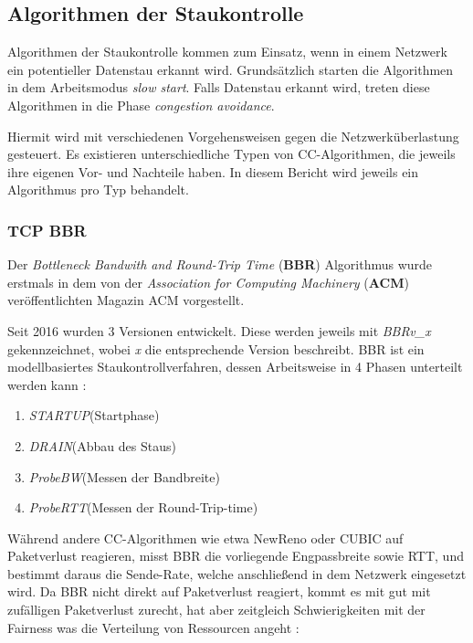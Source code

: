 \documentclass[paper=a4,fontsize=12pt,ngerman]{scrartcl}
\begin{document}
\subsection{Algorithmen der Staukontrolle }

Algorithmen der Staukontrolle kommen zum Einsatz, wenn in einem Netzwerk ein potentieller Datenstau erkannt wird.
Grundsätzlich starten die Algorithmen in dem Arbeitsmodus \textit{slow start}.
Falls Datenstau erkannt wird, treten diese Algorithmen in die Phase \textit{congestion avoidance}.


Hiermit wird mit verschiedenen Vorgehensweisen gegen die Netzwerküberlastung gesteuert. 
\newline
Es existieren unterschiedliche Typen von CC-Algorithmen, die jeweils ihre eigenen Vor- und Nachteile haben.
In diesem Bericht wird jeweils ein Algorithmus pro Typ behandelt.





\subsubsection{TCP BBR} 
Der \textit{Bottleneck Bandwith and Round-Trip Time} (\textbf{BBR}) Algorithmus wurde erstmals in dem von der
\textit{Association for Computing Machinery} (\textbf{ACM}) veröffentlichten Magazin ACM vorgestellt. \cite{cardwell2016bbr}

Seit 2016 wurden 3 Versionen entwickelt. Diese werden jeweils mit \textit{BBRv\_x} gekennzeichnet, 
wobei \textit{x} die entsprechende Version beschreibt. 
BBR ist ein modellbasiertes Staukontrollverfahren, dessen Arbeitsweise in 4 Phasen
unterteilt werden kann : \newline

\begin{enumerate}
    \item \textit{STARTUP}(Startphase)
    \item \textit{DRAIN}(Abbau des Staus)
    \item \textit{ProbeBW}(Messen der Bandbreite)
    \item \textit{ProbeRTT}(Messen der Round-Trip-time)
\end{enumerate}


Während andere CC-Algorithmen wie etwa NewReno oder CUBIC auf Paketverlust reagieren, misst BBR die vorliegende Engpassbreite sowie RTT,
und bestimmt daraus die Sende-Rate, welche anschließend in dem Netzwerk eingesetzt wird. 
Da BBR nicht direkt auf Paketverlust reagiert, kommt es mit gut mit zufälligen Paketverlust zurecht, hat aber zeitgleich
Schwierigkeiten mit der Fairness was die Verteilung von Ressourcen angeht : 
\end{document}
